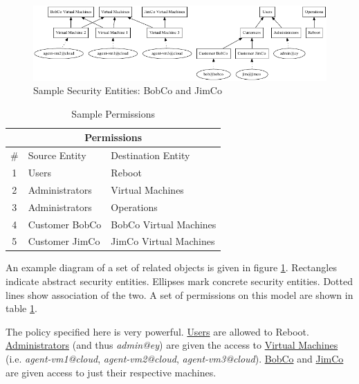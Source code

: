 \begin{figure}[t]
	\begin{center}\includegraphics[width=\myfigwidth,height=\myfigheight,keepaspectratio]{figs/dot/bobco1}\end{center}
	\caption[Example Security Entities]{Sample Security Entities: BobCo and JimCo}\label{fig:bobco1-sec}
\end{figure}
\begin{table}[b]
	\begin{center}
		\begin{tabular}{| c | l | l |}
			\hline
				\multicolumn{3}{|c|}{Permissions} \\
			\hline
				\# & Source Entity & Destination Entity \\
			\hline \hline
				1 & Users & Reboot \\
			\hline
				2 & Administrators & Virtual Machines \\
			\hline
				3 & Administrators & Operations \\
			\hline
				4 & Customer BobCo & BobCo Virtual Machines \\
			\hline
				5 & Customer JimCo & JimCo Virtual Machines \\
			\hline
		\end{tabular}
	\end{center}
	\caption{Sample Permissions}
	\label{tbl:bobco1-perm}
\end{table}

An example diagram of a set of related objects is given in figure \ref{fig:bobco1-sec}.  Rectangles indicate abstract security entities. Ellipses mark concrete security entities. Dotted lines show association of the two.  A set of permissions on this model are shown in table \ref{tbl:bobco1-perm}.

The policy specified here is very powerful. \underline{Users} are allowed to \textsf{Reboot}.  \underline{Administrators} (and thus \emph{admin@ey}) are given the access to \underline{Virtual Machines} (i.e. \emph{agent-vm1@cloud}, \emph{agent-vm2@cloud}, \emph{agent-vm3@cloud}).  \underline{BobCo} and \underline{JimCo} are given access to just their respective machines.

